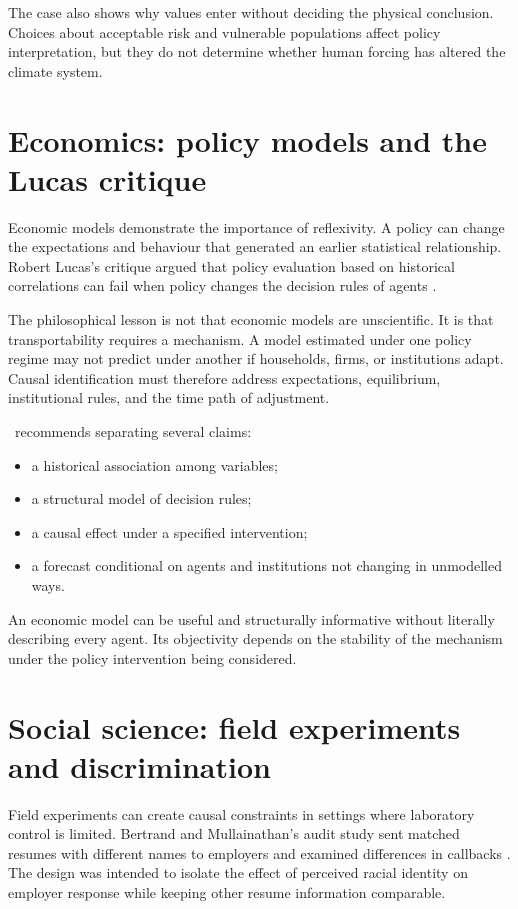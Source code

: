 The case also shows why values enter without deciding the physical conclusion.
Choices about acceptable risk and vulnerable populations affect policy
interpretation, but they do not determine whether human forcing has altered
the climate system.

\section{Economics: policy models and the Lucas critique}

Economic models demonstrate the importance of reflexivity. A policy can change
the expectations and behaviour that generated an earlier statistical
relationship. Robert Lucas's critique argued that policy evaluation based on
historical correlations can fail when policy changes the decision rules of
agents \citep{lucas1976}.

The philosophical lesson is not that economic models are unscientific. It is
that transportability requires a mechanism. A model estimated under one policy
regime may not predict under another if households, firms, or institutions
adapt. Causal identification must therefore address expectations,
equilibrium, institutional rules, and the time path of adjustment.

\RCR\ recommends separating several claims:

\begin{itemize}
\item a historical association among variables;
\item a structural model of decision rules;
\item a causal effect under a specified intervention;
\item a forecast conditional on agents and institutions not changing in
unmodelled ways.
\end{itemize}

An economic model can be useful and structurally informative without literally
describing every agent. Its objectivity depends on the stability of the
mechanism under the policy intervention being considered.

\section{Social science: field experiments and discrimination}

Field experiments can create causal constraints in settings where laboratory
control is limited. Bertrand and Mullainathan's audit study sent matched
resumes with different names to employers and examined differences in
callbacks \citep{bertrandmullainathan2004}. The design was intended to isolate
the effect of perceived racial identity on employer response while keeping
other resume information comparable.

